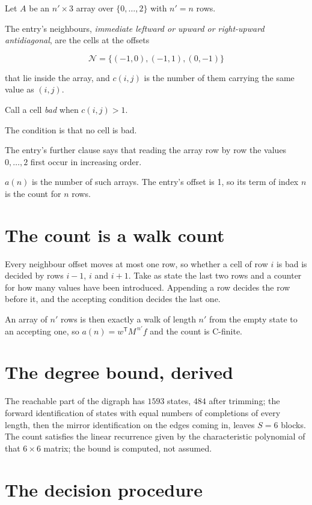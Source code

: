 \documentclass[11pt]{article}
\theoremstyle{definition}
\begin{document}
Let $A$ be an $n' \times 3$ array over $\{0,\dots,2\}$ with $n' = n$ rows.

The entry's neighbours, {\itshape immediate leftward or upward or right-upward antidiagonal}, are the cells at the offsets

\[\mathcal{N} = \{(-1,0), (-1,1), (0,-1)\}\]

that lie inside the array, and $c(i,j)$ is the number of them carrying the same value as $(i,j)$.

Call a cell {\itshape bad} when $c(i,j) > 1$.

The condition is that no cell is bad.

The entry's further clause says that reading the array row by row the values $0,\dots,2$ first occur in increasing order.

$a(n)$ is the number of such arrays. The entry's offset is 1, so its term of index $n$ is the count for $n$ rows.

\section{The count is a walk count}

Every neighbour offset moves at most one row, so whether a cell of row $i$ is bad is decided by rows $i-1$, $i$ and $i+1$. Take as state the last two rows and a counter for how many values have been introduced. Appending a row decides the row before it, and the accepting condition decides the last one.

An array of $n'$ rows is then exactly a walk of length $n'$ from the empty state to an accepting one, so $a(n) = w^{\mathsf T}M^{\,n'}f$ and the count is C-finite.

\section{The degree bound, derived}

The reachable part of the digraph has $1593$ states, $484$ after trimming; the forward identification of states with equal numbers of completions of every length, then the mirror identification on the edges coming in, leaves $S = 6$ blocks. The count satisfies the linear recurrence given by the characteristic polynomial of that $6\times6$ matrix; the bound is computed, not assumed.

\section{The decision procedure}
\end{document}
